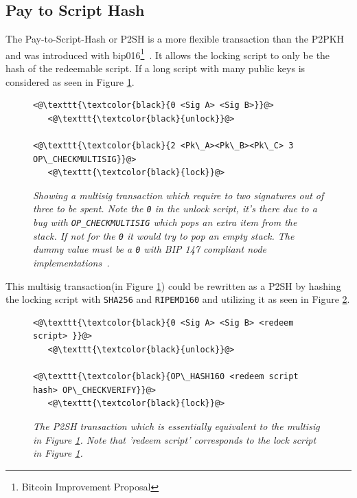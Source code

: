 \subsection{Pay to Script Hash}

The Pay-to-Script-Hash or P2SH is a more flexible transaction than the P2PKH and was introduced with \gls{bip}016\footnote{Bitcoin Improvement Proposal}~\cite{bip:0016:p2sh}. It allows the locking script to only be the hash of the redeemable script. If a long script with many public keys is considered as seen in Figure \ref{fig:cumbersome:script}.

\newpage

\begin{figure}
	\centering
	\begin{lstlisting}
<@\texttt{\textcolor{black}{0 <Sig A> <Sig B>}}@>   
   <@\texttt{\textcolor{black}{unlock}}@>
	
<@\texttt{\textcolor{black}{2 <Pk\_A><Pk\_B><Pk\_C> 3 OP\_CHECKMULTISIG}}@>
   <@\texttt{\textcolor{black}{lock}}@>
	\end{lstlisting}
	
	\caption{\textit{ Showing a multisig transaction which require to two signatures out of three to be spent. Note the \texttt{0} in the unlock script, it's there due to a bug with \texttt{OP\_CHECKMULTISIG} which pops an extra item from the stack. If not for the \texttt{0} it would try to pop an empty stack. The dummy value must be a \texttt{0} with BIP 147 compliant \gls{node} implementations~\cite{bip:0147:dummy:zero}.
	}}
	\label{fig:cumbersome:script}
\end{figure} 

This multisig transaction(in Figure \ref{fig:cumbersome:script}) could be rewritten as a P2SH by hashing the locking script with \texttt{SHA256} and  \texttt{RIPEMD160} and utilizing it as seen in Figure \ref{fig:p2sh}.

\begin{figure}[hbt!]
	
	\begin{lstlisting}
<@\texttt{\textcolor{black}{0 <Sig A> <Sig B> <redeem script> }}@>   
   <@\texttt{\textcolor{black}{unlock}}@>
	
<@\texttt{\textcolor{black}{OP\_HASH160 <redeem script hash> OP\_CHECKVERIFY}}@>
   <@\texttt{\textcolor{black}{lock}}@>
	\end{lstlisting}
	
	\caption{\textit{ The P2SH transaction which is essentially equivalent to the multisig in Figure \ref{fig:cumbersome:script}.
			Note that 'redeem script' corresponds to the lock script in Figure \ref{fig:cumbersome:script}.
	}}
	\label{fig:p2sh}
\end{figure}

